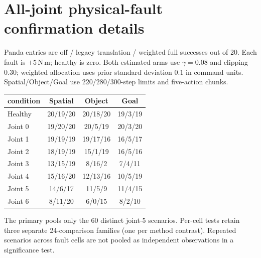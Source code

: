 \documentclass{article}
\begin{document}
\section{All-joint physical-fault confirmation details}
\label{app:joint}
Panda entries are off / legacy translation / weighted full successes out of 20.
Each fault is $+5$\,N\,m; healthy is zero. Both estimated arms use $\gamma=0.08$ and
clipping $0.30$; weighted allocation uses prior standard deviation $0.1$ in command units.
Spatial/Object/Goal use 220/280/300-step limits and five-action chunks.
\begin{center}\small
\begin{tabular}{lccc}
\toprule
condition & Spatial & Object & Goal \\
\midrule
Healthy & 20/19/20 & 20/18/20 & 19/3/19 \\
Joint 0 & 19/20/20 & 20/5/19 & 20/3/20 \\
Joint 1 & 19/19/19 & 19/17/16 & 16/5/17 \\
Joint 2 & 18/19/19 & 15/1/19 & 16/5/16 \\
Joint 3 & 13/15/19 & 8/16/2 & 7/4/11 \\
Joint 4 & 15/16/20 & 12/13/16 & 10/5/19 \\
Joint 5 & 14/6/17 & 11/5/9 & 11/4/15 \\
Joint 6 & 8/11/20 & 6/0/15 & 8/2/10 \\
\bottomrule
\end{tabular}
\end{center}
The primary pools only the 60 distinct joint-5 scenarios. Per-cell tests retain three
separate 24-comparison families (one per method contrast). Repeated scenarios across
fault cells are not pooled as independent observations in a significance test.
\end{document}
